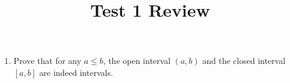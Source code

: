 \documentclass[10pt,a4paper,oneside]{book}
\title{Test 1 Review}
\author{}
\date{}
\begin{document}
\maketitle

\begin{enumerate}
    \item  Prove that for any $a\leq b$, the open interval $(a,b)$ and the closed interval $[a,b]$ are indeed intervals.
 
\end{enumerate}
\end{document}
